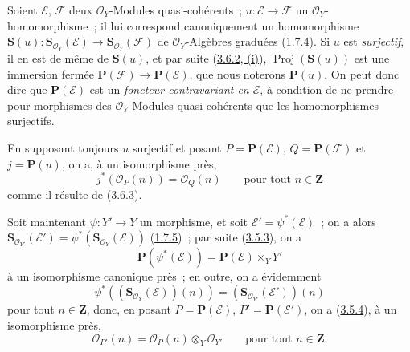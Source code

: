 \begin{env}[4.1.2]
\label{II.4.1.2-fr}
Soient $\mathcal{E}$, $\mathcal{F}$ deux $\mathcal{O}_Y$-Modules
quasi-cohérents~; $u:\mathcal{E}\to\mathcal{F}$ un
$\mathcal{O}_Y$-homomorphisme~; il lui correspond canoniquement un
homomorphisme
$\mathbf{S}(u):\mathbf{S}_{\mathcal{O}_Y}(\mathcal{E})\to
\mathbf{S}_{\mathcal{O}_Y}(\mathcal{F})$ de $\mathcal{O}_Y$-Algèbres
graduées (\hyperref[II.1.7.4-fr]{1.7.4}). Si $u$ est \emph{surjectif}, il en
est de même de $\mathbf{S}(u)$, et par suite
(\hyperref[II.3.6.2-fr]{3.6.2, (i)}),
$\operatorname{Proj}(\mathbf{S}(u))$ est une immersion fermée
$\mathbf{P}(\mathcal{F})\to\mathbf{P}(\mathcal{E})$, que nous noterons
$\mathbf{P}(u)$. On peut donc dire que $\mathbf{P}(\mathcal{E})$ est un
\emph{foncteur contravariant en $\mathcal{E}$}, à condition de ne prendre
pour morphismes des $\mathcal{O}_Y$-Modules quasi-cohérents que les
homomorphismes surjectifs.

En supposant toujours $u$ surjectif et posant
$P=\mathbf{P}(\mathcal{E})$, $Q=\mathbf{P}(\mathcal{F})$ et
$j=\mathbf{P}(u)$, on a, à un isomorphisme près,
\[
\label{II.4.1.2.1-fr}
  j^*(\mathcal{O}_P(n))=\mathcal{O}_Q(n)
  \qquad\text{pour tout }n\in\mathbf{Z}
\tag{4.1.2.1}
\]
comme il résulte de (\hyperref[II.3.6.3-fr]{3.6.3}).
\end{env}

\begin{env}[4.1.3]
\label{II.4.1.3-fr}
Soit maintenant $\psi:Y'\to Y$ un morphisme, et soit
$\mathcal{E}'=\psi^*(\mathcal{E})$~; on a alors
$\mathbf{S}_{\mathcal{O}_{Y'}}(\mathcal{E}')=
\psi^*(\mathbf{S}_{\mathcal{O}_Y}(\mathcal{E}))$
(\hyperref[II.1.7.5-fr]{1.7.5})~; par suite
(\hyperref[II.3.5.3-fr]{3.5.3}), on a
\[
\label{II.4.1.3.1-fr}
  \mathbf{P}(\psi^*(\mathcal{E}))=
  \mathbf{P}(\mathcal{E})\times_YY'
\tag{4.1.3.1}
\]
à un isomorphisme canonique près~; en outre, on a évidemment
\[
  \psi^*((\mathbf{S}_{\mathcal{O}_Y}(\mathcal{E}))(n))
  =(\mathbf{S}_{\mathcal{O}_{Y'}}(\mathcal{E}'))(n)
\]
pour tout $n\in\mathbf{Z}$, donc, en posant $P=\mathbf{P}(\mathcal{E})$,
$P'=\mathbf{P}(\mathcal{E}')$, on a
(\hyperref[II.3.5.4-fr]{3.5.4}), à un isomorphisme près,
\[
\label{II.4.1.3.2-fr}
  \mathcal{O}_{P'}(n)=\mathcal{O}_P(n)\otimes_Y\mathcal{O}_{Y'}
  \qquad\text{pour tout }n\in\mathbf{Z}.
\tag{4.1.3.2}
\]
\end{env}

